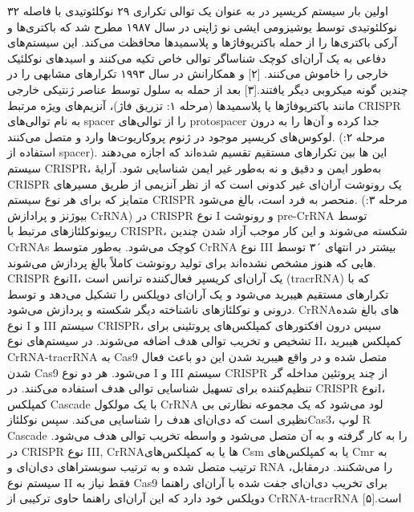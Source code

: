 \documentclass[12pt,a4paper,BCOR=.7cm,headsepline,bibliography=totoc]{report}
\begin{document}
اولین بار سیستم کریسپر در
 به عنوان یک توالی تکراری ۲۹ نوکلئوتیدی با فاصله ۳۲ نوکلئوتیدی توسط یوشیزومی ایشی نو ژاپنی در سال ۱۹۸۷ مطرح شد که باکتری‌ها و آرکی باکتری‌ها را از حمله باکتریوفاژها و پلاسمیدها محافظت می‌کند. این سیستم‌های دفاعی به یک آر‌ان‌ای کوچک شناساگر توالی خاص تکیه می‌کنند و اسیدهای نوکلئیک خارجی را خاموش می‌کنند.
[۲] 
 و همکارانش در سال ۱۹۹۳ تکرارهای مشابهی را در چندین گونه میکروبی دیگر یافتند.[۳]
بعد از حمله به سلول توسط عناصر ژنتیکی خارجی مانند باکتریوفاژها یا پلاسمیدها (مرحله ۱: تزریق فاژ)، آنزیم‌های ویژه مرتبط CRISPR
 به نام
 توالی‌های spacer را از توالی‌های protospacer جدا کرده و آن‌ها را به درون لوکوس‌های کریسپر موجود در ژنوم پروکاریوت‌ها وارد و متصل می‌کنند. (مرحله ۲: استفاده از spacer). این 
ها
 بین تکرارهای مستقیم تقسیم شده‌اند که اجازه می‌دهند سیستم CRISPR، به‌طور ایمن و دقیق و نه به‌طور غیر ایمن شناسایی شود. آرایهٔ CRISPR یک رونوشت آر‌ان‌ای غیر کدونی است که از نظر آنزیمی از طریق مسیرهای متمایز که برای هر نوع سیستم CRISPR منحصر به فرد است، بالغ می‌شود. (مرحله ۳: بیوژنز و پرادازش CrRNA) در CRISPR نوع I و
رونوشت pre-CrRNA توسط ریبونوکلئازهای مرتبط با CRISPR، شکسته می‌شوند و این کار موجب آزاد شدن چندین CrRNAs کوچک می‌شود. به‌طور متوسط CrRNA نوع III بیشتر در انتهای ´۳ توسط
 هایی 
که هنوز مشخص نشده‌اند برای تولید رونوشت کاملاً بالغ پردازش می‌شوند. CRISPR نوعII، یک آر‌ان‌ای کریسپر فعال‌کننده ترانس است (tracrRNA) که با تکرارهای مستقیم هیبرید می‌شود و یک آر‌ان‌ای دوپلکس را تشکیل می‌دهد و توسط 
 درونی و نوکلئازهای ناشناخته دیگر شکسته و پردازش می‌شود. CrRNAهای بالغ شده نوع I و III سیستم CRISPR، سپس درون افکتورهای کمپلکس‌های پروتئینی برای تشخیص و تخریب توالی هدف اضافه می‌شوند. در سیستم‌های نوع II، کمپلکس هیبرید CrRNA-tracrRNA به Cas9 متصل شده و در واقع هیبرید شدن این دو باعث فعال شدن Cas9 می‌شود. هر دو نوع I و III سیستم CRISPR از چند پروتئین مداخله گر تنظیم‌کننده برای تسهیل شناسایی توالی هدف استفاده می‌کنند. در CRISPR نوعI، کمپلکس Cascade با یک مولکول CrRNA لود می‌شود که یک مجموعه نظارتی بی نظیری است که دی‌ان‌ای هدف را شناسایی می‌کند. سپس نوکلئازCas3، لوپ R Cascade را به کار گرفته و به آن متصل می‌شود و واسطه تخریب توالی هدف می‌شود. در CRISPR نوع III, CrRNAها یا به کمپلکس‌های Csm یا به کمپلکس‌های Cmr به ترتیب متصل شده و به ترتیب سوبستراهای دی‌ان‌ای و RNA را می‌شکنند. درمقابل، سیستم نوع II فقط نیاز به Cas9 برای تخریب دی‌ان‌ای جفت شده با آر‌ان‌ای راهنما دوپلکس خود دارد که این آر‌ان‌ای راهنما حاوی ترکیبی از CrRNA-tracrRNA است.[۵]
\end{document}
